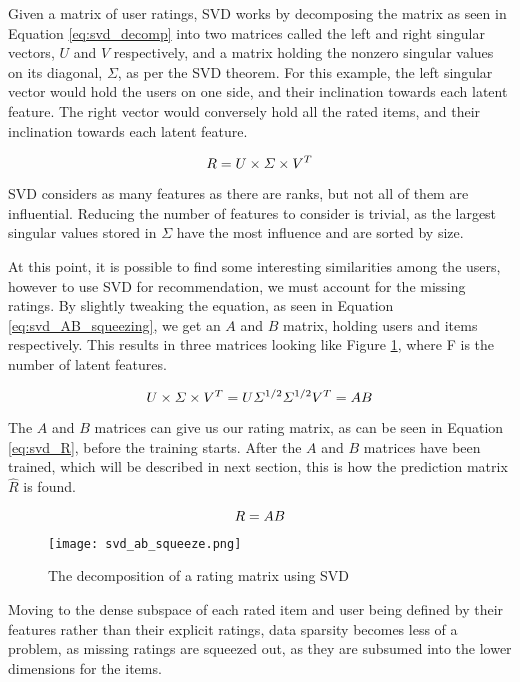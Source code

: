 Given a matrix of user ratings, SVD works by decomposing the matrix as seen in Equation \ref{eq:svd_decomp} into two matrices called the left and right singular vectors, $U$ and $V$ respectively, and a matrix holding the nonzero singular values on its diagonal, $\Sigma$, as per the SVD theorem\cite{svdtheorem}. For this example, the left singular vector would hold the users on one side, and their inclination towards each latent feature. The right vector would conversely hold all the rated items, and their inclination towards each latent feature\cite{linearalgebra_svd}\cite{recsys_svd}. 

\begin{equation} \label{eq:svd_decomp}
\centering
R = U\times \Sigma \times V^T
\end{equation}

SVD considers as many features as there are ranks, but not all of them are influential. Reducing the number of features to consider is trivial, as the largest singular values stored in $\Sigma$ have the most influence and are sorted by size.

At this point, it is possible to find some interesting similarities among the users, however to use SVD for recommendation, we must account for the missing ratings. By slightly tweaking the equation, as seen in Equation \ref{eq:svd_AB_squeezing}, we get an $A$ and $B$ matrix, holding users and items respectively. This results in three matrices looking like Figure \ref{fig:svdSqueeze}, where F is the number of latent features. 

\begin{equation}\label{eq:svd_AB_squeezing}
\centering
U\times \Sigma \times V^T = U\Sigma^{1/2} \Sigma^{1/2}V^T = AB
\end{equation}

The $A$ and $B$ matrices can give us our rating matrix, as can be seen in Equation \ref{eq:svd_R}, before the training starts. After the $A$ and $B$ matrices have been trained, which will be described in next section, this is how the prediction matrix $\hat{R}$ is found.

\begin{equation}\label{eq:svd_R}
\centering
R = AB
\end{equation}

\begin{figure}[H]
	\centering
	\texttt{[image: svd\_ab\_squeeze.png]}
	\caption{The decomposition of a rating matrix using SVD\cite{recsys_svd}}
	\label{fig:svdSqueeze}
\end{figure}
Moving to the dense subspace of each rated item and user being defined by their features rather than their explicit ratings, data sparsity becomes less of a problem, as missing ratings are squeezed out, as they are subsumed into the lower dimensions for the items.

